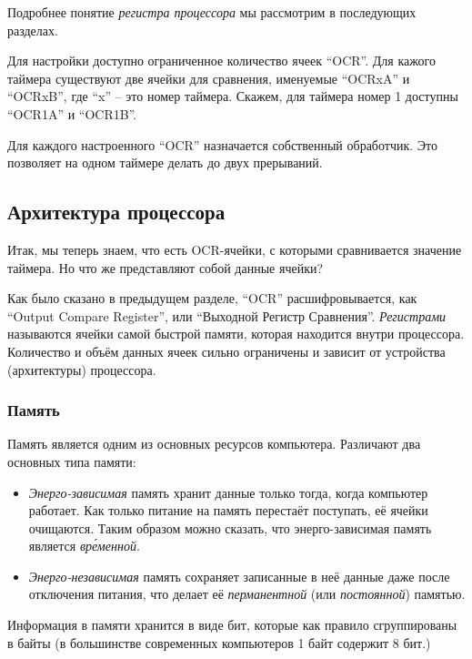 \documentclass[../sparc.tex]{subfiles}
\begin{document}
Подробнее понятие \emph{регистра процессора} мы рассмотрим в последующих
разделах.

Для настройки доступно ограниченное количество ячеек ``OCR''.  Для кажого
таймера существуют две ячейки для сравнения, именуемые ``OCRxA'' и ``OCRxB'',
где ``x'' -- это номер таймера.  Скажем, для таймера номер 1 доступны ``OCR1A'' и
``OCR1B''.

Для каждого настроенного ``OCR'' назначается собственный обработчик.  Это
позволяет на одном таймере делать до двух прерываний.

\subsection{Архитектура процессора}

Итак, мы теперь знаем, что есть \gls{OCR}-ячейки, с которыми сравнивается
значение таймера.  Но что же представляют собой данные ячейки?

Как было сказано в предыдущем разделе, ``OCR'' расшифровывается, как ``Output
Compare Register'', или ``Выходной Регистр Сравнения''.  \emph{Регистрами}
называются ячейки самой быстрой памяти, которая находится внутри процессора.
Количество и объём данных ячеек сильно ограничены и зависит от устройства
(архитектуры) процессора.

\subsubsection{Память}

Память является одним из основных ресурсов компьютера.  Различают два основных
типа памяти:
\begin{itemize}
\item \emph{Энерго-зависимая} память хранит данные только тогда, когда компьютер
  работает.  Как только питание на память перестаёт поступать, её ячейки
  очищаются.  Таким образом можно сказать, что энерго-зависимая память является
  \emph{вр\'еменной}.
\item \emph{Энерго-независимая} память сохраняет записанные в неё данные даже
  после отключения питания, что делает её \emph{перманентной} (или
  \emph{постоянной}) памятью.
\end{itemize}

Информация в памяти хранится в виде бит, которые как правило сгруппированы в
байты (в большинстве современных компьютеров 1 байт содержит 8 бит.)
\end{document}
